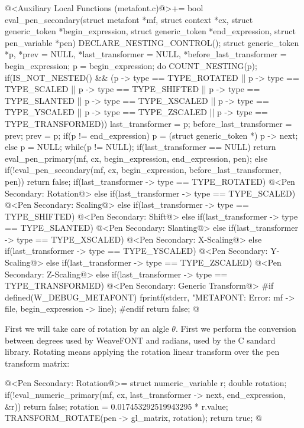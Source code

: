 {{{{{\iniciocodigo
@<Auxiliary Local Functions (metafont.c)@>+=
bool eval_pen_secondary(struct metafont *mf, struct context *cx,
                        struct generic_token *begin_expression,
                        struct generic_token *end_expression,
                        struct pen_variable *pen){
  DECLARE_NESTING_CONTROL();
  struct generic_token *p, *prev = NULL, *last_transformer = NULL,
                       *before_last_transformer = begin_expression;
  p = begin_expression;
  do{
    COUNT_NESTING(p);
    if(IS_NOT_NESTED() && (p -> type == TYPE_ROTATED ||
       p -> type == TYPE_SCALED || p -> type == TYPE_SHIFTED ||
       p -> type == TYPE_SLANTED || p -> type == TYPE_XSCALED ||
       p -> type == TYPE_YSCALED || p -> type == TYPE_ZSCALED ||
       p -> type == TYPE_TRANSFORMED)){
      last_transformer = p;
      before_last_transformer = prev;
    }
    prev = p;
    if(p != end_expression)
      p = (struct generic_token *) p -> next;
    else
      p = NULL;
  }while(p != NULL);
  if(last_transformer == NULL)
    return eval_pen_primary(mf, cx, begin_expression, end_expression, pen);
  else{
    if(!eval_pen_secondary(mf, cx, begin_expression, before_last_transformer, pen))
      return false;
    if(last_transformer -> type == TYPE_ROTATED){
      @<Pen Secondary: Rotation@>
    }
    else if(last_transformer -> type == TYPE_SCALED){
      @<Pen Secondary: Scaling@>
    }
    else if(last_transformer -> type == TYPE_SHIFTED){
      @<Pen Secondary: Shift@>
    }
    else if(last_transformer -> type == TYPE_SLANTED){
      @<Pen Secondary: Slanting@>
    }
    else if(last_transformer -> type == TYPE_XSCALED){
      @<Pen Secondary: X-Scaling@>
    }
    else if(last_transformer -> type == TYPE_YSCALED){
      @<Pen Secondary: Y-Scaling@>
    }
    else if(last_transformer -> type == TYPE_ZSCALED){
      @<Pen Secondary: Z-Scaling@>
    }
    else if(last_transformer -> type == TYPE_TRANSFORMED){
      @<Pen Secondary: Generic Transform@>
    }
#if defined(W_DEBUG_METAFONT)
    fprintf(stderr, "METAFONT: Error: %
            mf -> file, begin_expression -> line);
#endif
    return false;
  }
}
@
\fimcodigo

First we will take care of rotation by an algle $\theta$. First we
perform the conversion between degrees used by WeaveFONT and radians,
used by the C sandard library. Rotating means applying the rotation
linear transform over the pen transform matrix:

\iniciocodigo
@<Pen Secondary: Rotation@>=
struct numeric_variable r;
double rotation;
if(!eval_numeric_primary(mf, cx, last_transformer -> next, end_expression, &r))
  return false;
rotation = 0.017453292519943295 * r.value;
TRANSFORM_ROTATE(pen -> gl_matrix, rotation);
return true;
@
\fimcodigo

}}}}}
